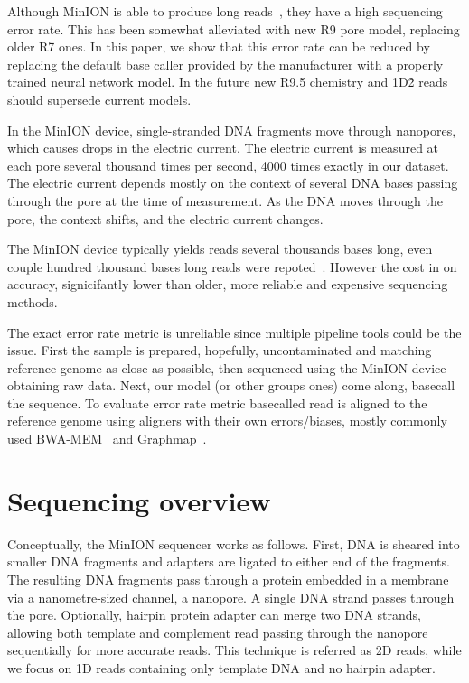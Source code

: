 \documentclass[runningheads,a4paper]{llncs}
\begin{document}
Although MinION is able to produce long reads~\cite{loman1-100k,loman2-800k}, they have a high sequencing error rate. This has been somewhat alleviated with new R9 pore model, replacing older R7 ones. In this paper, we show that this error rate can be reduced by replacing the default base caller provided by the manufacturer with a properly trained neural network model. In the future new R9.5 chemistry and 1D\^2 reads should supersede current models.

In the MinION device, single-stranded DNA fragments move through nanopores, which causes drops in the electric current. The electric current is measured at each pore several thousand times per second, 4000 times exactly in our dataset. The electric current depends mostly on the context of several DNA bases passing through the pore at the time of measurement. As the DNA moves through the pore, the context shifts, and the electric current changes.

The MinION device typically yields reads several thousands bases long, even couple hundred thousand bases long reads were repoted~\cite{loman1-100k,loman2-800k}. However the cost in on accuracy, signicifantly lower than older, more reliable and expensive sequencing methods.

The exact error rate metric is unreliable since multiple pipeline tools could be the issue. First the sample is prepared, hopefully, uncontaminated and matching reference genome as close as possible, then sequenced using the MinION device obtaining raw data. Next, our model (or other groups ones) come along, basecall the sequence. To evaluate error rate metric basecalled read is aligned to the reference genome using aligners with their own errors/biases, mostly commonly used BWA-MEM~\cite{li2013aligning} and Graphmap~\cite{sovic2016fast}.

\section{Sequencing overview}
Conceptually, the MinION sequencer works as follows. First, DNA is sheared into smaller DNA fragments and adapters are ligated to either end of the fragments. The resulting DNA fragments pass through a protein embedded in a membrane via a nanometre-sized channel, a nanopore. A single DNA strand passes through the pore. Optionally, hairpin protein adapter can merge two DNA strands, allowing both template and complement read passing through the nanopore sequentially for more accurate reads. This technique is referred as 2D reads, while we focus on 1D reads containing only template DNA and no hairpin adapter.
\end{document}
